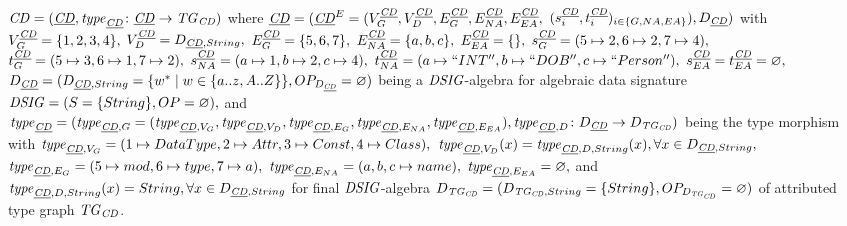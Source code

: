 \begin{example}
\paragraph*{}
$\mathit{CD}=(\underline{\mathit{CD}},\mathit{type}_{\underline{\mathit{CD}}}\colon \underline{\mathit{CD}} \to \mathit{TG}_\mathit{CD})$ where $\underline{\mathit{CD}}=(\underline{\mathit{CD}}^E=(V_G^{\underline{\mathit{CD}}},V_D^{\underline{\mathit{CD}}},E_G^{\underline{\mathit{CD}}},E_{NA}^{\underline{\mathit{CD}}},E_{EA}^{\underline{\mathit{CD}}},$ $(s_i^{\underline{\mathit{CD}}},t_i^{\underline{\mathit{CD}}})_{i \in \{G,NA,EA\}}),D_{\underline{\mathit{CD}}})$ with 
\newline
$V_G^{\underline{\mathit{CD}}}=\{1,2,3,4\},$
\newline
$V_D^{\underline{\mathit{CD}}}=D_{\underline{\mathit{CD}},String},$
\newline
$E_G^{\underline{\mathit{CD}}}=\{5,6,7\},$
\newline
$E_{NA}^{\underline{\mathit{CD}}}=\{a,b,c\},$
\newline
$E_{EA}^{\underline{\mathit{CD}}}=\{\},$
\newline
$s_G^{\underline{\mathit{CD}}}=(5 \mapsto 2,6 \mapsto 2,7 \mapsto 4),$
\newline
$t_G^{\underline{\mathit{CD}}}=(5 \mapsto 3,6 \mapsto 1,7 \mapsto 2),$
\newline
$s_{NA}^{\underline{\mathit{CD}}}=(a \mapsto 1,b \mapsto 2, c \mapsto 4),$
\newline
$t_{NA}^{\underline{\mathit{CD}}}=(a \mapsto ``INT'',b \mapsto ``DOB'',c \mapsto ``Person''),$
\newline
$s_{EA}^{\underline{\mathit{CD}}}=t_{EA}^{\underline{\mathit{CD}}}=\varnothing,$
\newline
$D_{\underline{\mathit{CD}}}=(D_{\underline{\mathit{CD}},String}=\{w^* \mid w \in \{a..z,A..Z\}\},OP_{D_{\underline{\mathit{CD}}}}=\varnothing)$ being a $\mathit{DSIG}$-algebra for algebraic data signature $\mathit{DSIG}=(S=\{String\},OP=\varnothing),$ and
\newline
$\mathit{type}_{\underline{\mathit{CD}}}=(\mathit{type}_{\underline{\mathit{CD}},G}=(\mathit{type}_{\underline{\mathit{CD}},V_G},\mathit{type}_{\underline{\mathit{CD}},V_D},\mathit{type}_{\underline{\mathit{CD}},E_G},\mathit{type}_{\underline{\mathit{CD}},E_{NA}},\mathit{type}_{\underline{\mathit{CD}},E_{EA}}),\mathit{type}_{\underline{\mathit{CD}},D}\colon D_{\underline{\mathit{CD}}} \to D_{\mathit{TG}_\mathit{CD}})$ being the type morphism with
\newline
$\mathit{type}_{\underline{\mathit{CD}},V_G}=(1 \mapsto DataType,2 \mapsto Attr,3 \mapsto Const,4 \mapsto Class),$
\newline
$\mathit{type}_{\underline{\mathit{CD}},V_D}(x)=\mathit{type}_{\underline{\mathit{CD}},D,String}(x),\forall x \in D_{\underline{\mathit{CD}},String},$
\newline
$\mathit{type}_{\underline{\mathit{CD}},E_G}=(5 \mapsto mod,6 \mapsto type,7 \mapsto a),$
\newline
$\mathit{type}_{\underline{\mathit{CD}},E_{NA}}=(a,b,c \mapsto name),$
\newline
$\mathit{type}_{\underline{\mathit{CD}},E_{EA}}=\varnothing,$ and
\newline
$\mathit{type}_{\underline{\mathit{CD}},D,String}(x)=String,\forall x \in D_{\underline{\mathit{CD}},String}$ for final $\mathit{DSIG}$-algebra $D_{\mathit{TG}_\mathit{CD}}=(D_{\mathit{TG}_\mathit{CD},String}=\{String\},OP_{D_{\mathit{TG}_\mathit{CD}}}=\varnothing)$ of attributed type graph $\mathit{TG}_\mathit{CD}$.


\end{example}
